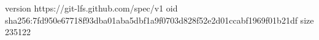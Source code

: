 version https://git-lfs.github.com/spec/v1
oid sha256:7fd950e67718f93dba01aba5dbf1a9f0703d828f52e2d01ccabf1969f01b21df
size 235122
